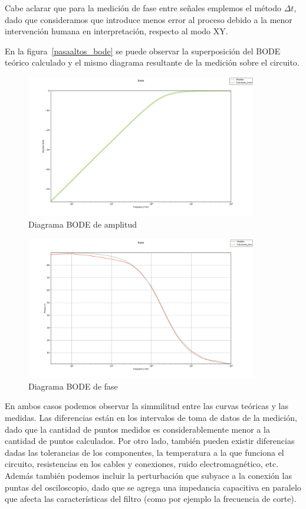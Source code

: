  Cabe aclarar que para la medición de fase entre señales emplemos el método $\Delta t$, dado que consideramos que introduce menos error al proceso debido a la menor intervención humana en interpretación, respecto al modo \textsc{XY}.

 En la figura~\ref{pasaaltos_bode} se puede observar la superposición del BODE teórico calculado y el mismo diagrama resultante de la medición sobre el circuito.

 \begin{figure}[H]
    \centering
    \includegraphics[width = 0.9\textwidth]{../Desarrollo/pasaaltos_bode_amp.png}
    \caption{Diagrama BODE de amplitud}
    \label{fig:pasaaltos_bode_amp}
 \end{figure}

 \begin{figure}[H]
    \centering
    \includegraphics[width = 0.9\textwidth]{../Desarrollo/pasaaltos_bode_pha.png}
    \caption{Diagrama BODE de fase}
    \label{fig:pasaaltos_bode_phase}
 \end{figure}

 En ambos casos podemos observar la simmilitud entre las curvas teóricas y las medidas. Las diferencias están en los intervalos de toma de datos de la medición, dado que la cantidad de puntos medidos es considerablemente menor a la cantidad de puntos calculados.
  Por otro lado, también pueden existir diferencias dadas las tolerancias de los componentes, la temperatura a la que funciona el circuito, resistencias en los cables y conexiones, ruido electromagnético, etc. 
 Además también podemos incluir la perturbación que subyace a la conexión las puntas del osciloscopio, dado que se agrega una impedancia capacitiva en paralelo que afecta las características del filtro (como por ejemplo la frecuencia de corte).

